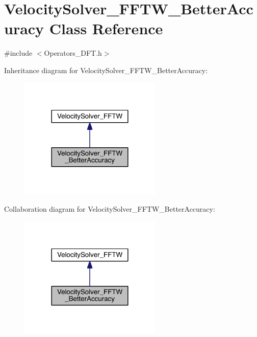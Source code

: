 \hypertarget{class_velocity_solver___f_f_t_w___better_accuracy}{}\section{Velocity\+Solver\+\_\+\+F\+F\+T\+W\+\_\+\+Better\+Accuracy Class Reference}
\label{class_velocity_solver___f_f_t_w___better_accuracy}


{\ttfamily \#include $<$Operators\+\_\+\+D\+F\+T.\+h$>$}



Inheritance diagram for Velocity\+Solver\+\_\+\+F\+F\+T\+W\+\_\+\+Better\+Accuracy\+:\nopagebreak
\begin{figure}[H]
\begin{center}
\leavevmode
\includegraphics[width=192pt]{d1/dfd/class_velocity_solver___f_f_t_w___better_accuracy__inherit__graph}
\end{center}
\end{figure}


Collaboration diagram for Velocity\+Solver\+\_\+\+F\+F\+T\+W\+\_\+\+Better\+Accuracy\+:\nopagebreak
\begin{figure}[H]
\begin{center}
\leavevmode
\includegraphics[width=192pt]{d9/d86/class_velocity_solver___f_f_t_w___better_accuracy__coll__graph}
\end{center}
\end{figure}

